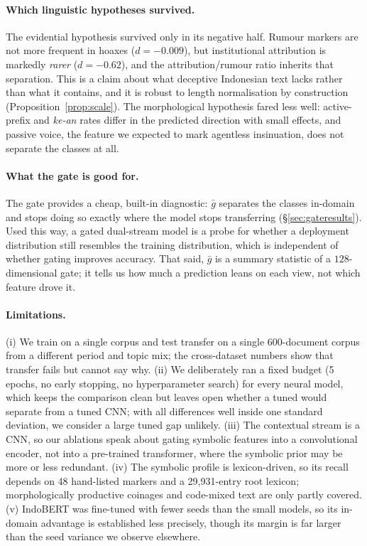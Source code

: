 \paragraph{Which linguistic hypotheses survived.}
The evidential hypothesis survived only in its negative half. Rumour markers are not more frequent in
hoaxes ($d=-0.009$), but institutional attribution is markedly \emph{rarer} ($d=-0.62$), and the
attribution/rumour ratio inherits that separation. This is a claim about what deceptive Indonesian text
lacks rather than what it contains, and it is robust to length normalisation by construction
(Proposition~\ref{prop:scale}). The morphological hypothesis fared less well: active-prefix and
\emph{ke-an} rates differ in the predicted direction with small effects, and passive voice, the feature we
expected to mark agentless insinuation, does not separate the classes at all.

\paragraph{What the gate is good for.}
The gate provides a cheap, built-in diagnostic: $\bar g$ separates the classes in-domain and stops doing so
exactly where the model stops transferring (\S\ref{sec:gateresults}). Used this way, a gated dual-stream
model is a probe for whether a deployment distribution still resembles the training distribution, which is
independent of whether gating improves accuracy. That said, $\bar g$ is a summary statistic of a
$128$-dimensional gate; it tells us how much a prediction leans on each view, not which feature drove it.

\paragraph{Limitations.}
(i) We train on a single corpus and test transfer on a single 600-document corpus from a different
period and topic mix; the cross-dataset numbers show that transfer fails but cannot say why.
(ii) We deliberately ran a fixed budget (5 epochs, no early stopping, no hyperparameter search) for every
neural model, which keeps the comparison clean but leaves open whether a tuned \menet{} would separate from
a tuned CNN; with all differences well inside one standard deviation, we consider a large tuned gap
unlikely. (iii) The contextual stream is a CNN, so our ablations speak about gating symbolic features into
a convolutional encoder, not into a pre-trained transformer, where the symbolic prior may be more or less
redundant. (iv) The symbolic profile is lexicon-driven, so its recall depends on 48 hand-listed markers and
a 29{,}931-entry root lexicon; morphologically productive coinages and code-mixed text are only partly
covered. (v) IndoBERT was fine-tuned with fewer seeds than the small models, so its in-domain advantage is
established less precisely, though its margin is far larger than the seed variance we observe elsewhere.


